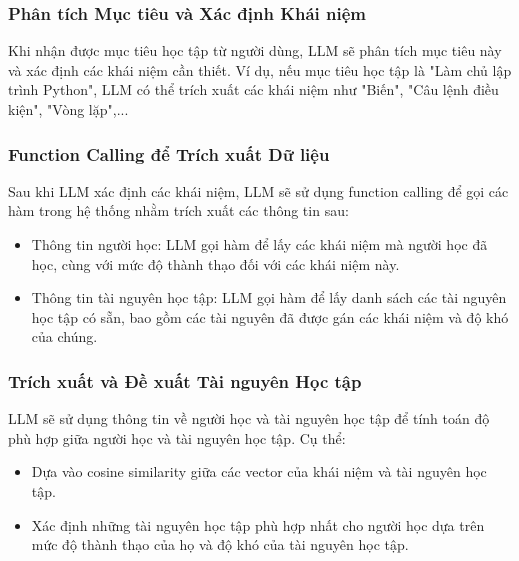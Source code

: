\subsubsection{Phân tích Mục tiêu và Xác định Khái niệm
}
Khi nhận được mục tiêu học tập từ người dùng, LLM sẽ phân tích mục tiêu này và xác định các khái niệm cần thiết. Ví dụ, nếu mục tiêu học tập là "Làm chủ lập trình Python", LLM có thể trích xuất các khái niệm như "Biến", "Câu lệnh điều kiện", "Vòng lặp",...
\subsubsection{Function Calling để Trích xuất Dữ liệu
}
Sau khi LLM xác định các khái niệm, LLM sẽ sử dụng function calling để gọi các hàm trong hệ thống nhằm trích xuất các thông tin sau:
\begin{itemize}
    \item Thông tin người học: LLM gọi hàm để lấy các khái niệm mà người học đã học, cùng với mức độ thành thạo đối với các khái niệm này.
    \item Thông tin tài nguyên học tập: LLM gọi hàm để lấy danh sách các tài nguyên học tập có sẵn, bao gồm các tài nguyên đã được gán các khái niệm và độ khó của chúng.
\end{itemize}
\subsubsection{Trích xuất và Đề xuất Tài nguyên Học tập
}
LLM sẽ sử dụng thông tin về người học và tài nguyên học tập để tính toán độ phù hợp giữa người học và tài nguyên học tập. Cụ thể:
\begin{itemize}
    \item Dựa vào cosine similarity giữa các vector của khái niệm và tài nguyên học tập.
    \item Xác định những tài nguyên học tập phù hợp nhất cho người học dựa trên mức độ thành thạo của họ và độ khó của tài nguyên học tập.

\end{itemize}
